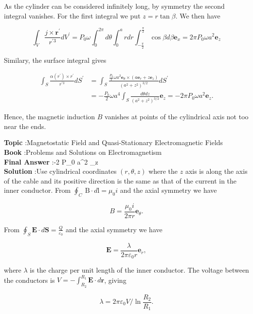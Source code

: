 \documentclass[10pt]{article}
\begin{document}
As the cylinder can be considered infinitely long, by symmetry the second integral vanishes. For the first integral we put $z=r \tan \beta$. We then have

$$
\int_{V} \frac{j \times \mathbf{r}^{\prime}}{r^{\prime 3}} d V^{\prime}=P_{0} \omega \int_{0}^{2 \pi} d \theta \int_{0}^{a} r d r \int_{-\frac{\pi}{2}}^{\frac{\pi}{2}} \cos \beta d \beta \mathbf{e}_{x}=2 \pi P_{0} \omega a^{2} \mathbf{e}_{z}
$$

Similary, the surface integral gives

$$
\begin{aligned}
\int_{S} \frac{\alpha\left(r^{\prime}\right) \times r^{\prime}}{r^{\prime 3}} d S^{\prime} &=\int_{S} \frac{\frac{P_{0}}{2} \omega a^{2} \mathbf{e}_{\theta} \times\left(a \mathbf{e}_{r}+z \mathbf{e}_{z}\right)}{\left(a^{2}+z^{2}\right)^{3 / 2}} d S^{\prime} \\
&=-\frac{P_{0}}{2} \omega a^{4} \int_{S} \frac{d \theta d z}{\left(a^{2}+z^{2}\right)^{3 / 2}} \mathbf{e}_{z}=-2 \pi P_{0} \omega a^{2} \mathbf{e}_{z} .
\end{aligned}
$$

Hence, the magnetic induction $B$ vanishes at points of the cylindrical axis not too near the ends.

\textbf{Topic} :Magnetostatic Field and Quasi-Stationary Electromagnetic Fields\\
\textbf{Book} :Problems and Solutions on Electromagnetism\\
\textbf{Final Answer} :-2 \pi P_{0} \omega a^{2} _{z}\\


\textbf{Solution} :Use cylindrical coordinates $(r, \theta, z)$ where the $z$ axis is along the axis of the cable and its positive direction is the same as that of the current in the inner conductor. From $\oint_{C} \mathrm{~B} \cdot d \mathrm{l}=\mu_{0} i$ and the axial symmetry we have

$$
B=\frac{\mu_{0} i}{2 \pi r} \mathbf{e}_{\theta} .
$$

From $\oint_{S} \mathbf{E} \cdot d \mathbf{S}=\frac{Q}{\varepsilon_{0}}$ and the axial symmetry we have

$$
\mathbf{E}=\frac{\lambda}{2 \pi \varepsilon_{0} r} \mathbf{e}_{r},
$$

where $\lambda$ is the charge per unit length of the inner conductor. The voltage between the conductors is $V=-\int_{R_{2}}^{R_{1}} \mathbf{E} \cdot d \mathbf{r}$, giving

$$
\lambda=2 \pi \varepsilon_{0} V / \ln \frac{R_{2}}{R_{1}} .
$$
\end{document}
